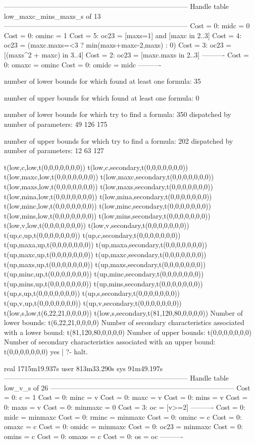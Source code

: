 --------------------------------------------------------------------------------
Handle table low_maxc_mins_maxs_s of 13
--------------------------------------------------------------------------------
Cost =  0:  midc  = 0
Cost =  0:  ominc = 1
Cost =  5:  oc23  = [maxs=1] and [maxc in 2..3]
Cost =  4:  oc23  = (maxc.maxs=<3 ? min(maxs+maxc-2,maxs) : 0)
Cost =  3:  oc23  = [(maxs^2 + maxc) in 3..4]
Cost =  2:  oc23  = [maxc.maxs in 2..3]
----------
Cost =  0:  omaxc = ominc
Cost =  0:  omidc = midc
----------


number of lower bounds for which found at least one formula: 35

number of upper bounds for which found at least one formula: 0

number of lower bounds for which try to find a formula: 350
dispatched by number of parameters: 49  126  175

number of upper bounds for which try to find a formula: 202
dispatched by number of parameters: 12  63  127

t(low,c,low,t(0,0,0,0,0,0,0))
t(low,c,secondary,t(0,0,0,0,0,0,0))
t(low,maxc,low,t(0,0,0,0,0,0,0))
t(low,maxc,secondary,t(0,0,0,0,0,0,0))
t(low,maxs,low,t(0,0,0,0,0,0,0))
t(low,maxs,secondary,t(0,0,0,0,0,0,0))
t(low,mina,low,t(0,0,0,0,0,0,0))
t(low,mina,secondary,t(0,0,0,0,0,0,0))
t(low,minc,low,t(0,0,0,0,0,0,0))
t(low,minc,secondary,t(0,0,0,0,0,0,0))
t(low,mins,low,t(0,0,0,0,0,0,0))
t(low,mins,secondary,t(0,0,0,0,0,0,0))
t(low,v,low,t(0,0,0,0,0,0,0))
t(low,v,secondary,t(0,0,0,0,0,0,0))
t(up,c,up,t(0,0,0,0,0,0,0))
t(up,c,secondary,t(0,0,0,0,0,0,0))
t(up,maxa,up,t(0,0,0,0,0,0,0))
t(up,maxa,secondary,t(0,0,0,0,0,0,0))
t(up,maxc,up,t(0,0,0,0,0,0,0))
t(up,maxc,secondary,t(0,0,0,0,0,0,0))
t(up,maxs,up,t(0,0,0,0,0,0,0))
t(up,maxs,secondary,t(0,0,0,0,0,0,0))
t(up,minc,up,t(0,0,0,0,0,0,0))
t(up,minc,secondary,t(0,0,0,0,0,0,0))
t(up,mins,up,t(0,0,0,0,0,0,0))
t(up,mins,secondary,t(0,0,0,0,0,0,0))
t(up,s,up,t(0,0,0,0,0,0,0))
t(up,s,secondary,t(0,0,0,0,0,0,0))
t(up,v,up,t(0,0,0,0,0,0,0))
t(up,v,secondary,t(0,0,0,0,0,0,0))
t(low,s,low,t(6,22,21,0,0,0,0))
t(low,s,secondary,t(81,120,80,0,0,0,0))
Number of lower bounds:                                             t(6,22,21,0,0,0,0)
Number of secondary characteristics associated with a lower bound:  t(81,120,80,0,0,0,0)
Number of upper bounds:                                             t(0,0,0,0,0,0,0)
Number of secondary characteristics associated with an upper bound: t(0,0,0,0,0,0,0)
yes
| ?- halt.

real	1715m19.937s
user	813m33.290s
sys	91m49.197s--------------------------------------------------------------------------------
Handle table low_v_s of 26
--------------------------------------------------------------------------------
Cost =  0:  c       = 1
Cost =  0:  minc    = v
Cost =  0:  maxc    = v
Cost =  0:  mins    = v
Cost =  0:  maxs    = v
Cost =  0:  minmaxc = 0
Cost =  3:  oc      = [v>=2]
----------
Cost =  0:  midc    = minmaxc
Cost =  0:  rminc   = minmaxc
Cost =  0:  ominc   = c
Cost =  0:  omaxc   = c
Cost =  0:  omidc   = minmaxc
Cost =  0:  oc23    = minmaxc
Cost =  0:  omins   = c
Cost =  0:  omaxs   = c
Cost =  0:  os      = oc
----------

